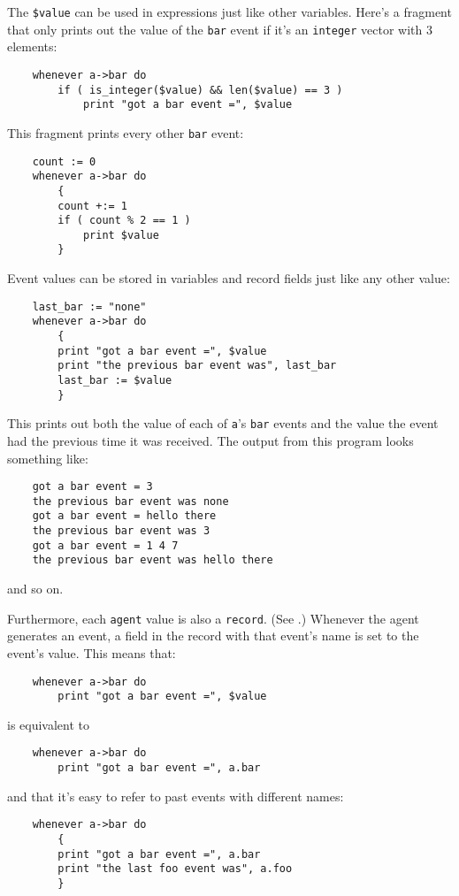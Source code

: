 The {\tt \$value} can be used in expressions just like other variables.
Here's a fragment that only prints out the value of the {\tt bar} event
if it's an {\tt integer} vector with 3 elements:
\begin{verbatim}
    whenever a->bar do
        if ( is_integer($value) && len($value) == 3 )
            print "got a bar event =", $value
\end{verbatim}
This fragment prints every other {\tt bar} event:
\begin{verbatim}
    count := 0
    whenever a->bar do
        {
        count +:= 1
        if ( count % 2 == 1 )
            print $value
        }
\end{verbatim}
Event values can be stored in variables and record fields just
like any other value:
\begin{verbatim}
    last_bar := "none"
    whenever a->bar do
        {
        print "got a bar event =", $value
        print "the previous bar event was", last_bar
        last_bar := $value
        }
\end{verbatim}
This prints out both the value of each of 
{\tt a}'s {\tt bar} events and the
value the event had the previous time it was received.  The output from
this program  looks something like:
\begin{verbatim}
    got a bar event = 3
    the previous bar event was none
    got a bar event = hello there
    the previous bar event was 3
    got a bar event = 1 4 7
    the previous bar event was hello there
\end{verbatim}
and so on.

Furthermore, each {\tt agent} value is also a {\tt record}. (See
.)
Whenever the agent generates an event, a field in the record with that event's
name is set to the event's value.  This means that:
\begin{verbatim}
    whenever a->bar do
        print "got a bar event =", $value
\end{verbatim}
is equivalent to
\begin{verbatim}
    whenever a->bar do
        print "got a bar event =", a.bar
\end{verbatim}
and that it's easy to refer to past events with different names:
\begin{verbatim}
    whenever a->bar do
        {
        print "got a bar event =", a.bar
        print "the last foo event was", a.foo
        }
\end{verbatim}

